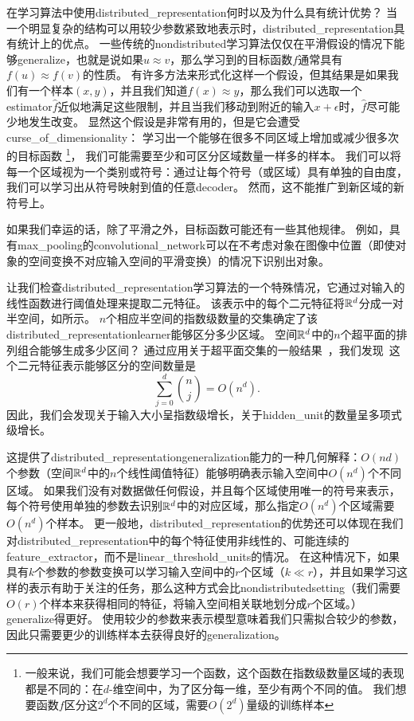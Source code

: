 
在学习算法中使用\gls{distributed_representation}何时以及为什么具有统计优势？
当一个明显复杂的结构可以用较少参数紧致地表示时，\gls{distributed_representation}具有统计上的优点。
一些传统的\gls{nondistributed}学习算法仅仅在平滑假设的情况下能够\gls{generalize}，也就是说如果$u\approx v$，那么学习到的目标函数$f$通常具有$f(u) \approx f(v)$的性质。
有许多方法来形式化这样一个假设，但其结果是如果我们有一个样本$(x,y)$，并且我们知道$f(x) \approx y$，那么我们可以选取一个\gls{estimator}$\hat{f}$近似地满足这些限制，并且当我们移动到附近的输入$x + \epsilon$时，$\hat{f}$尽可能少地发生改变。
显然这个假设是非常有用的，但是它会遭受\gls{curse_of_dimensionality}：
学习出一个能够在很多不同区域上增加或减少很多次的目标函数
\footnote{一般来说，我们可能会想要学习一个函数，这个函数在指数级数量区域的表现都是不同的：在$d$-维空间中，为了区分每一维，至少有两个不同的值。
我们想要函数$f$区分这$2^d$个不同的区域，需要$O(2^d)$量级的训练样本}，
我们可能需要至少和可区分区域数量一样多的样本。
我们可以将每一个区域视为一个类别或符号：通过让每个符号（或区域）具有单独的自由度，我们可以学习出从符号映射到值的任意\gls{decoder}。
然而，这不能推广到新区域的新符号上。


如果我们幸运的话，除了平滑之外，目标函数可能还有一些其他规律。
例如，具有\gls{max_pooling}的\gls{convolutional_network}可以在不考虑对象在图像中位置（即使对象的空间变换不对应输入空间的平滑变换）的情况下识别出对象。


让我们检查\gls{distributed_representation}学习算法的一个特殊情况，它通过对输入的线性函数进行阈值处理来提取二元特征。
该表示中的每个二元特征将$\mathbb{R}^d$分成一对半空间，如所示。
$n$个相应半空间的指数级数量的交集确定了该\gls{distributed_representation}\gls{learner}能够区分多少区域。
空间$\mathbb{R}^d$中的$n$个超平面的排列组合能够生成多少区间？
通过应用关于超平面交集的一般结果~\citep{Zaslavsky-1975}，我们发现~\citep{Pascanu+et+al-ICLR2014b}这个二元特征表示能够区分的空间数量是
\begin{equation}
	\sum_{j=0}^d \binom{n}{j} = O(n^d).
\end{equation}
因此，我们会发现关于输入大小呈指数级增长，关于\gls{hidden_unit}的数量呈多项式级增长。


这提供了\gls{distributed_representation}\gls{generalization}能力的一种几何解释：$O(nd)$个参数（空间$\mathbb{R}^d$中的$n$个线性阈值特征）能够明确表示输入空间中$O(n^d)$个不同区域。
如果我们没有对数据做任何假设，并且每个区域使用唯一的符号来表示，每个符号使用单独的参数去识别$\mathbb{R}^d$中的对应区域，那么指定$O(n^d)$个区域需要$O(n^d)$个样本。
更一般地，\gls{distributed_representation}的优势还可以体现在我们对\gls{distributed_representation}中的每个特征使用非线性的、可能连续的\gls{feature_extractor}，而不是\gls{linear_threshold_units}的情况。
在这种情况下，如果具有$k$个参数的参数变换可以学习输入空间中的$r$个区域（$k\ll r$），并且如果学习这样的表示有助于关注的任务，那么这种方式会比\gls{nondistributed}\gls{setting}（我们需要$O(r)$个样本来获得相同的特征，将输入空间相关联地划分成$r$个区域。）\gls{generalize}得更好。
使用较少的参数来表示模型意味着我们只需拟合较少的参数，因此只需要更少的训练样本去获得良好的\gls{generalization}。

